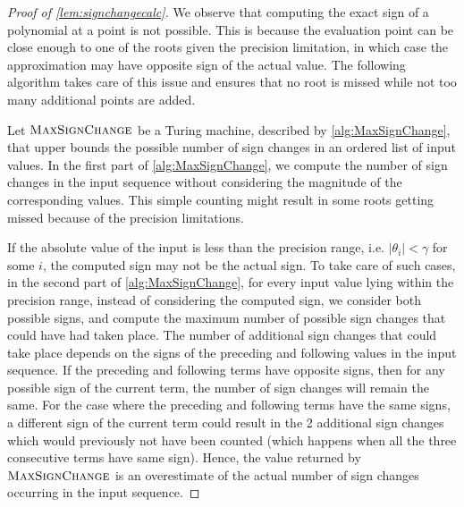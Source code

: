 \documentclass[a4paper,UKenglish,cleveref,autoref,thm-restate]{lipics-v2021}
\begin{document}
\begin{proof}[Proof of \cref{lem:signchangecalc}]
	We observe that computing the exact sign of a polynomial at a point
	is not possible. This is because the evaluation point can be close
	enough to one of the roots given the precision limitation, in which
	case the approximation may have opposite sign of the actual value.
	The following algorithm takes care of this issue and ensures that no
	root is missed while not too many additional points are added.
	
	Let $\textsc{MaxSignChange}$ be a Turing machine, described by
	\cref{alg:MaxSignChange}, that upper bounds the possible number of
	sign changes in an ordered list of input values. In the first part
	of \cref{alg:MaxSignChange}, we compute the number of sign changes
	in the input sequence without considering the magnitude of the
	corresponding values. This simple counting might result in some
	roots getting missed because of the precision limitations.
	
	If the absolute value of the input is less than the precision range,
	i.e. $|\theta_i|<\gamma$ for some $i$, the computed sign may not be
	the actual sign. To take care of such cases, in the second part of
	\cref{alg:MaxSignChange}, for every input value lying within the
	precision range, instead of considering the computed sign, we
	consider both possible signs, and compute the maximum number of
	possible sign changes that could have had taken place. The number of
	additional sign changes that could take place depends on the signs
	of the preceding and following values in the input sequence. If the
	preceding and following terms have opposite signs, then for any
	possible sign of the current term, the number of sign changes will
	remain the same. For the case where the preceding and following
	terms have the same signs, a different sign of the current term
	could result in the 2 additional sign changes which would previously
	not have been counted (which happens when all the three consecutive
	terms have same sign). Hence, the value returned by
	$\textsc{MaxSignChange}$ is an overestimate of the actual number of
	sign changes occurring in the input sequence.
	

\end{proof}
\end{document}
